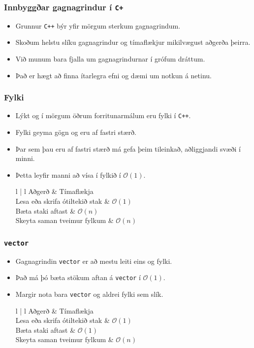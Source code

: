 \documentclass{beamer}
\newcommand\env[2]
{
	\begin{#1}
	#2
	\end{#1}
}
\begin{document}
\env{frame}
{
	\frametitle{Innbyggðar gagnagrindur í \texttt{C+}}
	\env{itemize}
	{
		\item<1-> Grunnur \texttt{C++} býr yfir mörgum sterkum gagnagrindum.
		\item<2-> Skoðum helstu slíku gagnagrindur og tímaflækjur mikilvægust aðgerða þeirra.
		\item<3-> Við munum bara fjalla um gagnagrindurnar í grófum dráttum.
		\item<4-> Það er hægt að finna ítarlegra efni og dæmi um notkun á netinu.
	}
}

\env{frame}
{
	\frametitle{Fylki}
	\env{itemize}
	{
		\item<1-> Lýkt og í mörgum öðrum forritunarmálum eru fylki í \texttt{C++}.
		\item<2-> Fylki geyma gögn og eru af fastri stærð.
		\item<3-> Þar sem þau eru af fastri stærð má gefa þeim tileinkað, aðliggjandi svæði í minni.
		\item<4-> Þetta leyfir manni að vísa í fylkið í $\mathcal{O}(1)$.
		\env{tabular}
		{
			{l | l}
			Aðgerð & Tímaflækja\\
			\hline
			Lesa eða skrifa ótiltekið stak & $\mathcal{O}(1)$\\
			Bæta staki aftast & $\mathcal{O}(n)$\\
			Skeyta saman tveimur fylkum & $\mathcal{O}(n)$\\
		}
	}
}

\env{frame}
{
	\frametitle{\texttt{vector}}
	\env{itemize}
	{
		\item<1-> Gagnagrindin \texttt{vector} er að mestu leiti eins og fylki.
		\item<2-> Það má þó bæta stökum aftan á \texttt{vector} í $\mathcal{O}(1)$.
		\item<3-> Margir nota bara \texttt{vector} og aldrei fylki sem slík.
		\env{tabular}
		{
			{l | l}
			Aðgerð & Tímaflækja\\
			\hline
			Lesa eða skrifa ótiltekið stak & $\mathcal{O}(1)$\\
			Bæta staki aftast & $\mathcal{O}(1)$\\
			Skeyta saman tveimur fylkum & $\mathcal{O}(n)$\\
		}
	}
}
\end{document}
